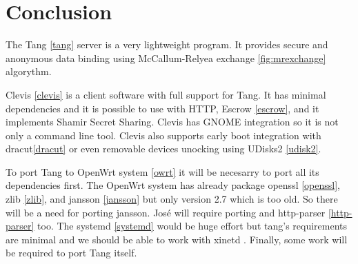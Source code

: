 \documentclass[../xdudla00-porting-Tang-to-Open-WRT.tex]{subfiles}
\begin{document}
\chapter{Conclusion}\label{conlusion}

The Tang \ref{tang} server is a very lightweight program.
It provides secure and anonymous data binding using McCallum-Relyea exchange \ref{fig:mrexchange} algorythm.

Clevis \ref{clevis} is a client software with full support for Tang.
It has minimal dependencies and it is possible to use with HTTP, Escrow \ref{escrow}, and it implements Shamir Secret Sharing\cite{sss}.
Clevis has GNOME \cite{gnome} integration so it is not only a command line tool.
Clevis also supports early boot integration with dracut\ref{dracut} or even removable devices unocking using UDisks2 \ref{udisk2}.

To port Tang to OpenWrt system \ref{owrt} it will be necesarry to port all its dependencies first.
The OpenWrt system has already package openssl \ref{openssl}, zlib \ref{zlib}, and jansson \ref{jansson} but only version 2.7 which is too old.
So there will be a need for porting jansson. José will require porting and http-parser \ref{http-parser} too.
The systemd \ref{systemd} would be huge effort but tang's requirements are minimal and we should be able to
work with xinetd \cite{xinetd}. Finally, some work will be required to port Tang itself.
\end{document}
